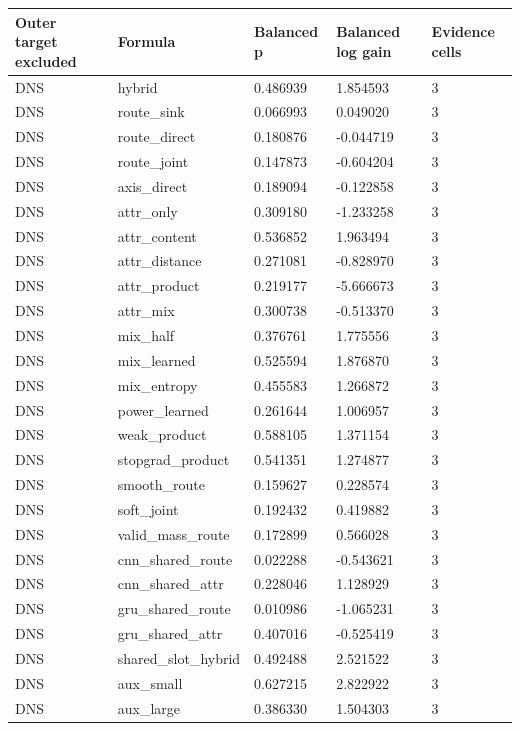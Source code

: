 \begin{tabular}{lllll}
\hline
Outer target excluded & Formula & Balanced p & Balanced log gain & Evidence cells \\
\hline
DNS & hybrid & 0.486939 & 1.854593 & 3 \\
DNS & route\_sink & 0.066993 & 0.049020 & 3 \\
DNS & route\_direct & 0.180876 & -0.044719 & 3 \\
DNS & route\_joint & 0.147873 & -0.604204 & 3 \\
DNS & axis\_direct & 0.189094 & -0.122858 & 3 \\
DNS & attr\_only & 0.309180 & -1.233258 & 3 \\
DNS & attr\_content & 0.536852 & 1.963494 & 3 \\
DNS & attr\_distance & 0.271081 & -0.828970 & 3 \\
DNS & attr\_product & 0.219177 & -5.666673 & 3 \\
DNS & attr\_mix & 0.300738 & -0.513370 & 3 \\
DNS & mix\_half & 0.376761 & 1.775556 & 3 \\
DNS & mix\_learned & 0.525594 & 1.876870 & 3 \\
DNS & mix\_entropy & 0.455583 & 1.266872 & 3 \\
DNS & power\_learned & 0.261644 & 1.006957 & 3 \\
DNS & weak\_product & 0.588105 & 1.371154 & 3 \\
DNS & stopgrad\_product & 0.541351 & 1.274877 & 3 \\
DNS & smooth\_route & 0.159627 & 0.228574 & 3 \\
DNS & soft\_joint & 0.192432 & 0.419882 & 3 \\
DNS & valid\_mass\_route & 0.172899 & 0.566028 & 3 \\
DNS & cnn\_shared\_route & 0.022288 & -0.543621 & 3 \\
DNS & cnn\_shared\_attr & 0.228046 & 1.128929 & 3 \\
DNS & gru\_shared\_route & 0.010986 & -1.065231 & 3 \\
DNS & gru\_shared\_attr & 0.407016 & -0.525419 & 3 \\
DNS & shared\_slot\_hybrid & 0.492488 & 2.521522 & 3 \\
DNS & aux\_small & 0.627215 & 2.822922 & 3 \\
DNS & aux\_large & 0.386330 & 1.504303 & 3 \\

\end{tabular}
